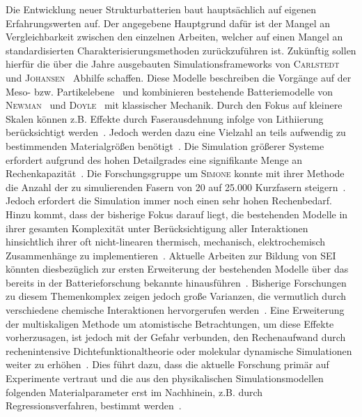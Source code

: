Die Entwicklung neuer Strukturbatterien baut hauptsächlich auf eigenen Erfahrungswerten auf. Der angegebene Hauptgrund dafür ist der Mangel an Vergleichbarkeit zwischen den einzelnen Arbeiten, welcher auf einen Mangel an standardisierten Charakterisierungsmethoden zurückzuführen ist. Zukünftig sollen hierfür die über die Jahre ausgebauten Simulationsframeworks von \textsc{Carlstedt}~\cite{Carlstedt2022,Carlstedt2022a,Carlstedt2022b} und \textsc{Johansen}~\cite{Larsson2023,Siraj2023,Johansen2024} Abhilfe schaffen. Diese Modelle beschreiben die Vorgänge auf der Meso- bzw. Partikelebene~\cite{Carlstedt2020b,Carlstedt2022a} und kombinieren bestehende Batteriemodelle von \textsc{Newman}~\cite{Bernardi1985,Pals1995,Pals1995a,Christensen2006,Newman2021} und \textsc{Doyle}~\cite{Doyle1993,Doyle1995} mit klassischer Mechanik. Durch den Fokus auf kleinere Skalen können z.B. Effekte durch Faserausdehnung infolge von Lithiierung berücksichtigt werden~\cite{Carlstedt2019,Carlstedt2020b,Duan2021,Johansen2024}. Jedoch werden dazu eine Vielzahl an teils aufwendig zu bestimmenden Materialgrößen benötigt~\cite{Plett2015}. Die Simulation größerer Systeme erfordert aufgrund des hohen Detailgrades eine signifikante Menge an Rechenkapazität~\cite{Carlstedt2019,Carlstedt2020b,Carlstedt2022a}. Die Forschungsgruppe um \textsc{Simone} konnte mit ihrer Methode die Anzahl der zu simulierenden Fasern von 20 auf 25.000 Kurzfasern steigern~\cite{Goudarzi2022}. Jedoch erfordert die Simulation immer noch einen sehr hohen Rechenbedarf. Hinzu kommt, dass der bisherige Fokus darauf liegt, die bestehenden Modelle in ihrer gesamten Komplexität unter Berücksichtigung aller Interaktionen hinsichtlich ihrer oft nicht-linearen thermisch, mechanisch, elektrochemisch Zusammenhänge zu implementieren~\cite{Carlstedt2019,Carlstedt2020b,Carlstedt2022a,Johansen2024}. Aktuelle Arbeiten zur Bildung von SEI könnten diesbezüglich zur ersten Erweiterung der bestehenden Modelle über das bereits in der Batterieforschung bekannte hinausführen~\cite{Yuecel2024}. Bisherige Forschungen zu diesem Themenkomplex zeigen jedoch große Varianzen, die vermutlich durch verschiedene chemische Interaktionen hervorgerufen werden~\cite{Rollin2023,Yuecel2024}. Eine Erweiterung der multiskaligen Methode um atomistische Betrachtungen, um diese Effekte vorherzusagen, ist jedoch mit der Gefahr verbunden, den Rechenaufwand durch rechenintensive Dichtefunktionaltheorie oder molekular dynamische Simulationen weiter zu erhöhen~\cite{Franco2019,Li2020a,Rollin2023}. Dies führt dazu, dass die aktuelle Forschung primär auf Experimente vertraut und die aus den physikalischen Simulationsmodellen folgenden Materialparameter erst im Nachhinein, z.B. durch Regressionsverfahren, bestimmt werden~\cite{Franco2013, Carlstedt2022, Carlstedt2023}.

